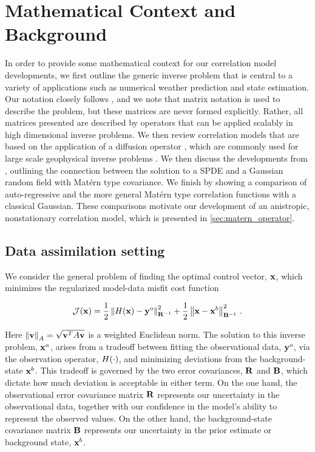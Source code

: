 \section{Mathematical Context and Background}
\label{sec:review}

In order to provide some mathematical context for our correlation model
developments, we first outline the generic inverse problem that is central to
a variety of applications such as numerical weather prediction and state
estimation.
Our notation closely follows \citet{ide_unified_1997}, and we note that matrix
notation is used to describe the problem, but these matrices are never formed
explicitly.
Rather, all matrices presented are described by operators that can be applied
scalably in high dimensional inverse problems.
We then review correlation models that are based on the application of a
diffusion operator \citep{weaver_correlation_2001,mirouze_representation_2010},
which are commonly used for large scale geophysical inverse problems
\citep[e.g.,][]{forgetECCOv4,moore_regional_2011-1}.
We then discuss the developments from , outlining the
connection between the solution to a SPDE and a Gaussian random
field with Mat\'ern type covariance.
We finish by showing a comparison of auto-regressive and the more general
Mat\'ern type correlation functions with a classical Gaussian.
These comparisons motivate our development of an anistropic, nonstationary correlation
model, which is presented in \cref{sec:matern_operator}.


\subsection{Data assimilation setting}
\label{ssec:da_formulation}

We consider the general problem of finding the optimal control vector,
$\mathbf{x}$, which minimizes the regularized model-data misfit cost function
\begin{linenomath*}\begin{equation*}
    \mathcal{J}(\mathbf{x}) =
        \dfrac{1}{2}\left\lVert H(\mathbf{x}) - \mathbf{y}^{o}\right\rVert_{\mathbf{R}^{-1}}^2
        +
        \dfrac{1}{2}\left\lVert\mathbf{x} - \mathbf{x}^{b}\right\rVert_{\mathbf{B}^{-1}}^2 \, .
\end{equation*}\end{linenomath*}
Here $\left\lVert\mathbf{v}\right\rVert_A = \sqrt{\mathbf{v}^T A \mathbf{v}}$ is a weighted
Euclidean norm.
The solution to this inverse problem, $\mathbf{x}^{a}$, arises from a tradeoff between fitting the
observational data, $\mathbf{y}^{o}$, via the observation operator, $H(\cdot)$,
and minimizing deviations from the background-state $\mathbf{x}^{b}$.
This tradeoff is governed by the two error covariances, $\mathbf{R}$ and
$\mathbf{B}$, which dictate how much deviation is acceptable in either term.
On the one hand, the observational error covariance matrix
$\mathbf{R}$ represents our uncertainty
in the observational data, together with our confidence in the model's ability
to represent the observed values.
On the other hand, the background-state covariance matrix $\mathbf{B}$
represents our uncertainty in the prior estimate or background state,
$\mathbf{x}^{b}$.

